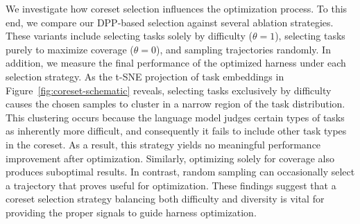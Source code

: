 \begin{table}[t]
\caption{Ablation of the diagnosis step across all three benchmarks. Each row re-renders full \method{}'s diagnoses with one cue blanked, holding the proposal agent's prompt fixed (\S\ref{sec:disc-diagnosis}). \emph{Raw trajectory} skips diagnosis and shows the proposal agent the raw trajectories directly. Cells report held-out pass rate.}
\label{tab:diagnosis}
\centering
\footnotesize
\setlength{\tabcolsep}{4pt}
\ifdim\wd0>\columnwidth
  \resizebox{\columnwidth}{!}{\usebox0}%
\else
  \usebox0%
\fi
\vspace{-1.5em}
\end{table}

 We investigate how coreset selection influences the optimization process.
To this end, we compare our DPP-based selection against several ablation strategies.
These variants include selecting tasks solely by difficulty ($\theta=1$), selecting tasks purely to maximize coverage ($\theta=0$), and sampling trajectories randomly.
In addition, we measure the final performance of the optimized harness under each selection strategy.
As the t-SNE projection of task embeddings in Figure~\ref{fig:coreset-schematic} reveals, selecting tasks exclusively by difficulty causes the chosen samples to cluster in a narrow region of the task distribution.
This clustering occurs because the language model judges certain types of tasks as inherently more difficult, and consequently it fails to include other task types in the coreset.
As a result, this strategy yields no meaningful performance improvement after optimization.
Similarly, optimizing solely for coverage also produces suboptimal results.
In contrast, random sampling can occasionally select a trajectory that proves useful for optimization.
These findings suggest that a coreset selection strategy balancing both difficulty and diversity is vital for providing the proper signals to guide harness optimization.


